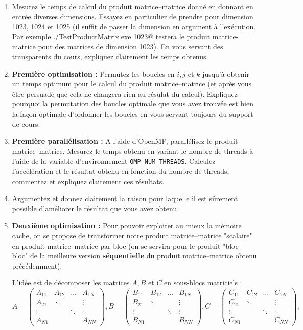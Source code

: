 \documentclass[11pt,a4paper]{article}
\begin{document}
\begin{enumerate}
	\item Mesurez le temps de calcul du produit matrice--matrice donné en donnant en entrée diverses dimensions. Essayez en particulier de prendre pour dimension 1023, 1024 et 1025 (il suffit de passer la dimension en argument à l'exécution. Par exemple \verb@./TestProductMatrix.exe 1023@ testera le produit matrice-matrice pour des matrices de dimension 1023). En vous servant des transparents du cours, expliquez clairement les temps obtenus.
	\item \textbf{\color{blue}Première optimisation :} Permutez les  boucles en $i,j$ et $k$ jusqu'à obtenir un temps optimum pour le calcul du produit matrice--matrice (et après vous être persuadé que cela ne changera rien au résulat du calcul). Expliquez pourquoi la permutation des boucles optimale que vous avez trouvée
	est bien la façon optimale d'ordonner les boucles en vous servant toujours du support de cours.
	\item \textbf{\color{blue}Première parallélisation :} A l'aide d'OpenMP, parallélisez le produit matrice--matrice. Mesurez le temps obtenu en variant le nombre de threads à l'aide de la variable d'environnement \texttt{OMP\_NUM\_THREADS}. Calculez l'accélération et le résultat obtenu en fonction du nombre de threads, commentez et expliquez clairement ces résultats. 
	\item Argumentez et donnez clairement la raison pour laquelle il est sûrement possible d'améliorer le résultat que vous avez obtenu.
	\item \textbf{\color{blue}Deuxième optimisation :} Pour pouvoir exploiter au mieux la mémoire cache, on se propose de transformer notre produit matrice--matrice "scalaire" en produit matrice--matrice par bloc (on se servira pour le produit "bloc--bloc" de la meilleure version \textbf{séquentielle} du produit matrice--matrice obtenu précédemment).

	L'idée est de décomposer les matrices $A,B$ et $C$ en sous-blocs matriciels :
	\[
	A = \left(
	\begin{array}{cccc}
	A_{11} & A_{12} & \ldots & A_{1N} \\
	A_{21} & \ddots &        & \vdots \\
	\vdots &        & \ddots & \vdots \\
	A_{N1} &        &        & A_{NN}
	\end{array}
	\right),
	B = \left(
	\begin{array}{cccc}
	B_{11} & B_{12} & \ldots & B_{1N} \\
	B_{21} & \ddots &        & \vdots \\
	\vdots &        & \ddots & \vdots \\
	B_{N1} &        &        & B_{NN}
	\end{array}
	\right),
	C = \left(
	\begin{array}{cccc}
	C_{11} & C_{12} & \ldots & C_{1N} \\
	C_{21} & \ddots &        & \vdots \\
	\vdots &        & \ddots & \vdots \\
	C_{N1} &        &        & C_{NN}
	\end{array}
	\right),
	\]


\end{enumerate}
\end{document}
